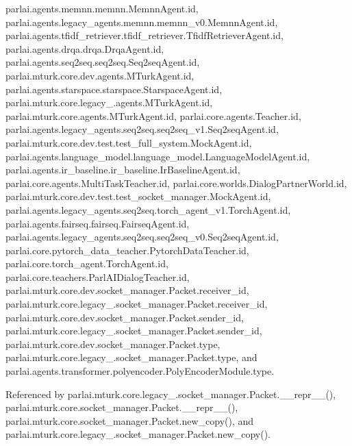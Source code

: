 parlai.\+agents.\+memnn.\+memnn.\+Memnn\+Agent.\+id, parlai.\+agents.\+legacy\+\_\+agents.\+memnn.\+memnn\+\_\+v0.\+Memnn\+Agent.\+id, parlai.\+agents.\+tfidf\+\_\+retriever.\+tfidf\+\_\+retriever.\+Tfidf\+Retriever\+Agent.\+id, parlai.\+agents.\+drqa.\+drqa.\+Drqa\+Agent.\+id, parlai.\+agents.\+seq2seq.\+seq2seq.\+Seq2seq\+Agent.\+id, parlai.\+mturk.\+core.\+dev.\+agents.\+M\+Turk\+Agent.\+id, parlai.\+agents.\+starspace.\+starspace.\+Starspace\+Agent.\+id, parlai.\+mturk.\+core.\+legacy\+\_.\+agents.\+M\+Turk\+Agent.\+id, parlai.\+mturk.\+core.\+agents.\+M\+Turk\+Agent.\+id, parlai.\+core.\+agents.\+Teacher.\+id, parlai.\+agents.\+legacy\+\_\+agents.\+seq2seq.\+seq2seq\+\_\+v1.\+Seq2seq\+Agent.\+id, parlai.\+mturk.\+core.\+dev.\+test.\+test\+\_\+full\+\_\+system.\+Mock\+Agent.\+id, parlai.\+agents.\+language\+\_\+model.\+language\+\_\+model.\+Language\+Model\+Agent.\+id, parlai.\+agents.\+ir\+\_\+baseline.\+ir\+\_\+baseline.\+Ir\+Baseline\+Agent.\+id, parlai.\+core.\+agents.\+Multi\+Task\+Teacher.\+id, parlai.\+core.\+worlds.\+Dialog\+Partner\+World.\+id, parlai.\+mturk.\+core.\+dev.\+test.\+test\+\_\+socket\+\_\+manager.\+Mock\+Agent.\+id, parlai.\+agents.\+legacy\+\_\+agents.\+seq2seq.\+torch\+\_\+agent\+\_\+v1.\+Torch\+Agent.\+id, parlai.\+agents.\+fairseq.\+fairseq.\+Fairseq\+Agent.\+id, parlai.\+agents.\+legacy\+\_\+agents.\+seq2seq.\+seq2seq\+\_\+v0.\+Seq2seq\+Agent.\+id, parlai.\+core.\+pytorch\+\_\+data\+\_\+teacher.\+Pytorch\+Data\+Teacher.\+id, parlai.\+core.\+torch\+\_\+agent.\+Torch\+Agent.\+id, parlai.\+core.\+teachers.\+Parl\+A\+I\+Dialog\+Teacher.\+id, parlai.\+mturk.\+core.\+dev.\+socket\+\_\+manager.\+Packet.\+receiver\+\_\+id, parlai.\+mturk.\+core.\+legacy\+\_.\+socket\+\_\+manager.\+Packet.\+receiver\+\_\+id, parlai.\+mturk.\+core.\+dev.\+socket\+\_\+manager.\+Packet.\+sender\+\_\+id, parlai.\+mturk.\+core.\+legacy\+\_.\+socket\+\_\+manager.\+Packet.\+sender\+\_\+id, parlai.\+mturk.\+core.\+dev.\+socket\+\_\+manager.\+Packet.\+type, parlai.\+mturk.\+core.\+legacy\+\_.\+socket\+\_\+manager.\+Packet.\+type, and parlai.\+agents.\+transformer.\+polyencoder.\+Poly\+Encoder\+Module.\+type.



Referenced by parlai.\+mturk.\+core.\+legacy\+\_.\+socket\+\_\+manager.\+Packet.\+\_\+\+\_\+repr\+\_\+\+\_\+(), parlai.\+mturk.\+core.\+socket\+\_\+manager.\+Packet.\+\_\+\+\_\+repr\+\_\+\+\_\+(), parlai.\+mturk.\+core.\+socket\+\_\+manager.\+Packet.\+new\+\_\+copy(), and parlai.\+mturk.\+core.\+legacy\+\_.\+socket\+\_\+manager.\+Packet.\+new\+\_\+copy().

